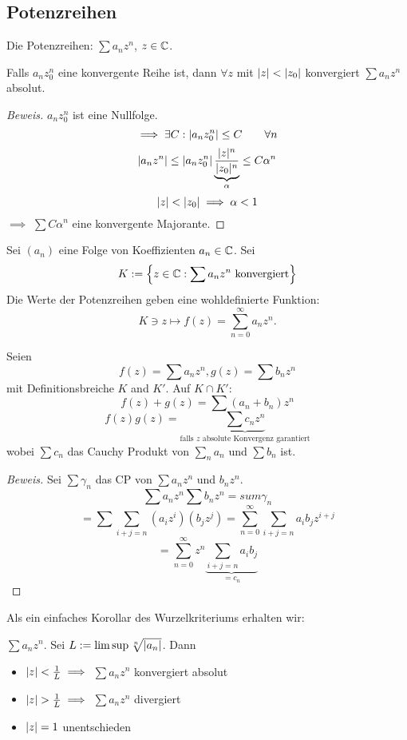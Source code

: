 \subsection{Potenzreihen}
\begin{Def}
  Die Potenzreihen: $\sum a_nz^n$, $z\in\mathbb{C}$.
\end{Def}
\begin{Lem}\label{l:Abel}
  Falls $a_nz_0^n$ eine konvergente Reihe ist, 
dann $\forall z$ mit $\mathopen| z \mathclose|<\mathopen| z_0 \mathclose|$ konvergiert $\sum a_nz^n$ absolut.
\end{Lem}
\begin{proof}[Beweis]
  $a_nz_0^n$ ist eine Nullfolge.
  \[\implies \exists C:\mathopen| a_nz_0^n \mathclose|\leq C\qquad\forall n\]
  \[\mathopen| a_nz^n \mathclose|\leq\mathopen| a_nz^n_0 \mathclose|\underbrace{\frac{\mathopen| z \mathclose|^n}{\mathopen| z_0 \mathclose|^n}}_\alpha\leq C\alpha^n\]
  \[\mathopen| z \mathclose|<\mathopen| z_0 \mathclose|\implies \alpha<1\]
  $\implies$ $\sum C\alpha^n$ eine konvergente Majorante.
\end{proof}
  Sei $(a_n)$ eine Folge von Koeffizienten $a_n\in\mathbb{C}$. Sei 
\[K:=\left\{ z\in\mathbb{C}:\sum a_nz^n\text{ konvergiert} \right\}\] 
Die Werte der Potenzreihen geben eine wohldefinierte Funktion:
\[K\ni z\mapsto f(z)=\sum^\infty_{n=0}a_nz^n.\]

\begin{Sat}
Seien
\[f(z)=\sum a_nz^n, g(z)=\sum b_nz^n\]
mit Definitionsbreiche $K$ and $K'$.
Auf $K\cap K'$:
\[f(z)+g(z)=\sum(a_n+b_n)z^n\]
\[f(z)g(z)=\underbrace{\sum c_nz^n}_{\text{falls $z$ absolute Konvergenz garantiert}}\]
wobei $\sum c_n$ das Cauchy Produkt von $\sum_n a_n$ und $\sum b_n$ ist.
\end{Sat}
\begin{proof}[Beweis]
  Sei $\sum \gamma_n$ das CP von $\sum a_nz^n$ und $b_nz^n$.
  \[\sum a_nz^n\sum b_nz^n = sum \gamma_n\]
  \[=\sum\sum_{i+j=n}\left( a_iz^i \right)\left( b_jz^j \right)=\sum^\infty_{n=0}\sum_{i+j=n}a_ib_jz^{i+j}\]
  \[=\sum_{n=0}^\infty z^n\underbrace{\sum_{i+j=n}a_ib_j}_{=c_n}\]
\end{proof}
Als ein einfaches Korollar des Wurzelkriteriums erhalten wir:
\begin{Sat} $\sum a_nz^n$. Sei $L:=\limsup \sqrt[n]{\mathopen| a_n \mathclose|}$. Dann 
  \begin{itemize}
    \item $\mathopen| z \mathclose|<\frac{1}{L}\implies$ $\sum a_nz^n$ konvergiert absolut
    \item $\abs{z}>\frac{1}{L}\implies$ $\sum a_nz^n$ divergiert
    \item $\mathopen| z \mathclose|=1$ unentschieden
  \end{itemize}
\end{Sat}
